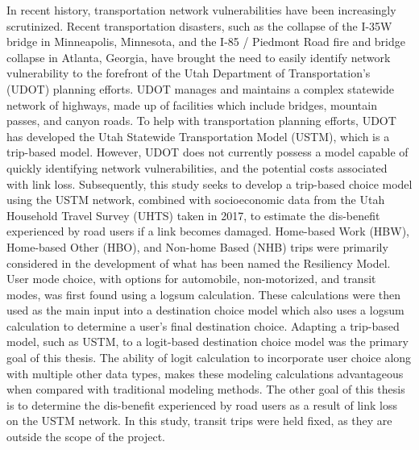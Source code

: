 \afterpage{\cleardoublepage}

In recent history, transportation network vulnerabilities have been increasingly
scrutinized. Recent transportation disasters, such as the collapse of the I-35W
bridge in Minneapolis, Minnesota, and the I-85 / Piedmont Road fire
and bridge collapse in Atlanta, Georgia, have brought the need to easily identify
network vulnerability to the forefront of the Utah Department of Transportation's
(UDOT) planning efforts. UDOT manages and maintains a complex statewide network of highways,
made up of facilities which include bridges, mountain passes, and canyon roads.
To help with transportation planning efforts, UDOT has developed the Utah
Statewide Transportation Model (USTM), which is a trip-based model. However,
UDOT does not currently possess a model capable of quickly identifying network
vulnerabilities, and the potential costs associated with link loss.
Subsequently, this study seeks to develop a trip-based
choice model using the USTM network, combined
with socioeconomic data from the Utah Household Travel Survey (UHTS) taken in
2017, to estimate the dis-benefit experienced by road users if a link becomes
damaged. Home-based Work (HBW), Home-based Other (HBO), and Non-home Based (NHB)
trips were primarily considered in the development of what has been named the
Resiliency Model. User mode
choice, with options for automobile, non-motorized, and transit modes, was first
found using a logsum calculation. These calculations were then used as the main
input into a destination choice model which also uses a logsum calculation to
determine a user's final destination choice. Adapting a trip-based model,
such as USTM, to a logit-based destination choice model was the primary goal of
this thesis. The ability of logit calculation to incorporate user choice along
with multiple other data types, makes these modeling calculations advantageous
when compared with
traditional modeling methods. The other goal of this thesis is to determine the
dis-benefit experienced by road users as a result of link loss on the USTM
network. In this study, transit trips were held
fixed, as they are outside the scope of the project.
